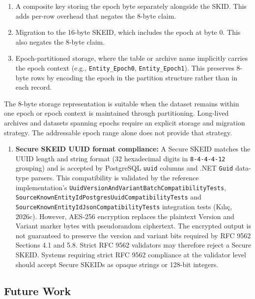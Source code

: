 \documentclass[fleqn,10pt]{wlpeerj}
\providecommand{\tightlist}{%
  \setlength{\itemsep}{0pt}\setlength{\parskip}{0pt}}
\begin{document}
\begin{enumerate}
  \begin{enumerate}
  \def\labelenumii{\arabic{enumii}.}
  \item
    A composite key storing the epoch byte separately alongside the
    SKID. This adds per-row overhead that negates the 8-byte claim.
  \item
    Migration to the 16-byte SKEID, which includes the epoch at byte 0.
    This also negates the 8-byte claim.
  \item
    Epoch-partitioned storage, where the table or archive name
    implicitly carries the epoch context (e.g., \texttt{Entity\_Epoch0},
    \texttt{Entity\_Epoch1}). This preserves 8-byte rows by encoding the
    epoch in the partition structure rather than in each record.
  \end{enumerate}
\end{enumerate}

The 8-byte storage representation is suitable when the dataset remains
within one epoch or epoch context is maintained through partitioning.
Long-lived archives and datasets spanning epochs require an explicit
storage and migration strategy. The addressable epoch range alone does
not provide that strategy.

\begin{enumerate}
\def\labelenumi{\arabic{enumi}.}
\setcounter{enumi}{5}
\tightlist
\item
  \textbf{Secure SKEID UUID format compliance:} A Secure SKEID matches
  the UUID length and string format (32 hexadecimal digits in
  \texttt{8-4-4-4-12} grouping) and is accepted by PostgreSQL
  \texttt{uuid} columns and .NET \texttt{Guid} data-type parsers. This
  compatibility is validated by the reference implementation's
  \texttt{UuidVersionAndVariantBatchCompatibilityTests},
  \texttt{SourceKnownEntityIdPostgresUuidCompatibilityTests} and
  \texttt{SourceKnownEntityIdJsonCompatibilityTests} integration tests
  (Kılıç, 2026c). However, AES-256 encryption replaces the plaintext
  Version and Variant marker bytes with pseudorandom ciphertext. The
  encrypted output is not guaranteed to preserve the version and variant
  bits required by RFC 9562 Sections 4.1 and 5.8. Strict RFC 9562
  validators may therefore reject a Secure SKEID. Systems requiring
  strict RFC 9562 compliance at the validator level should accept Secure
  SKEIDs as opaque strings or 128-bit integers.
\end{enumerate}

\subsection{Future Work}\label{future-work}
\end{document}
